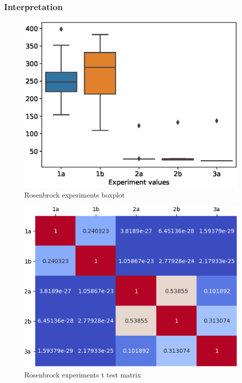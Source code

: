 \documentclass{article}
\begin{document}
\subsubsection{Interpretation}
\begin{figure}[!htbp]
	\centering
	\begin{minipage}{\textwidth}
		\centering
		\includegraphics[scale=.8]{boxplots/rosenbrock_boxplot.eps}
		\caption{Rosenbrock experiments boxplot}
	\end{minipage}\hfill
\end{figure}
\FloatBarrier

\begin{figure}[!htbp]
	\centering
	\begin{minipage}{\textwidth}
		\centering
		\includegraphics[scale=.8]{t_test/rosenbrock_t_test_matrix.png}
		\caption{Rosenbrock experiments t test matrix}
	\end{minipage}\hfill
\end{figure}
\FloatBarrier
\end{document}
